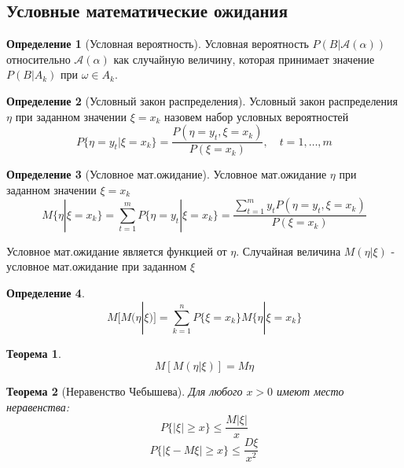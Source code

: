 \documentclass[a4paper]{article}
\newtheorem{theorem}{Теорема}[section]
\theoremstyle{definition}
\newtheorem*{definition}{Определение}
\theoremstyle{remark}
\begin{document}
\subsection{Условные математические ожидания}
\begin{definition}[Условная вероятность]
    Условная вероятность \(P(B|\mathscr{A}(\alpha))\) относительно \(\mathscr{A}(\alpha)\) как случайную величину, которая принимает значение \(P(B|A_k)\) при \(\omega \in A_k\).
\end{definition}
\begin{definition}[Условный закон распределения]
    Условный закон распределения $\eta $ при заданном значении $\xi = x_k$ назовем набор условных вероятностей
    \[P\{\eta = y_t | \xi = x_k\} = \frac{P(\eta = y_t, \xi = x_k)}{P(\xi = x_k)}, \quad t = 1, \dots, m\]
\end{definition}
\begin{definition}[Условное мат.ожидание]
    Условное мат.ожидание $\eta$ при заданном значении $\xi = x_k$
    \[M\{\eta | \xi = x_k\} = \sum_{t = 1}^{m} P\{\eta = y_t| \xi = x_k\} = \frac{\sum_{t = 1}^{m}y_t P(\eta = y_t, \xi = x_k)}{P(\xi = x_k)}\]
\end{definition}
Условное мат.ожидание является функцией от $\eta$. Случайная величина $M(\eta | \xi)$ - условное мат.ожидание при заданном $\xi$
\begin{definition}
    \[M[M(\eta | \xi)] = \sum_{k = 1}^{n} P\{\xi  = x_k\}M\{\eta | \xi = x_k\}\]
\end{definition}
\begin{theorem}
    \[M[M(\eta | \xi)] = M\eta\]
\end{theorem}
\begin{theorem}[Неравенство Чебышева]
    Для любого $x>0$ имеют место неравенства:
    \[P\{|\xi|\geq x\} \leq \frac{M|\xi|}{x}\]
    \[P\{|\xi - M\xi| \geq x\} \leq \frac{D \xi}{x^2}\]
\end{theorem}
\end{document}
